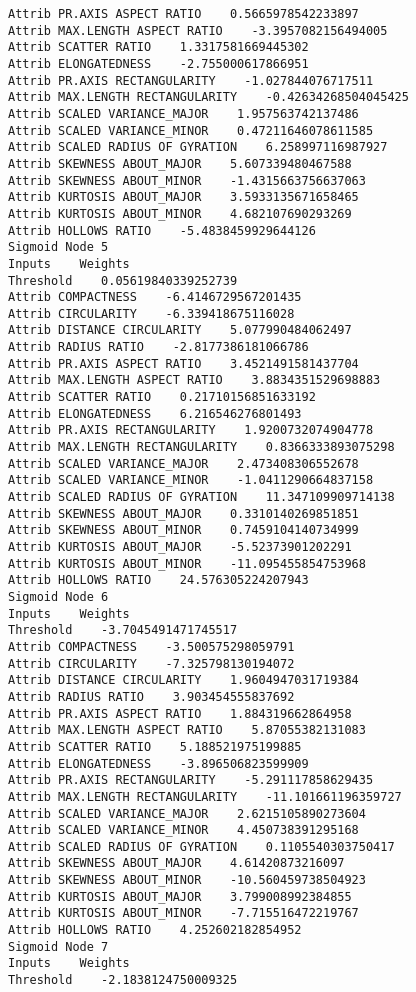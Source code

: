 \documentclass[
	article,			%
	11pt,				%
	oneside,			%
	a4paper,			%
	english,			%
	brazil,				%
	sumario=tradicional
	]{abntex2}
\begin{document}
\begin{lstlisting}
Attrib PR.AXIS ASPECT RATIO    0.5665978542233897
Attrib MAX.LENGTH ASPECT RATIO    -3.3957082156494005
Attrib SCATTER RATIO    1.3317581669445302
Attrib ELONGATEDNESS    -2.755000617866951
Attrib PR.AXIS RECTANGULARITY    -1.027844076717511
Attrib MAX.LENGTH RECTANGULARITY    -0.42634268504045425
Attrib SCALED VARIANCE_MAJOR    1.957563742137486
Attrib SCALED VARIANCE_MINOR    0.47211646078611585
Attrib SCALED RADIUS OF GYRATION    6.258997116987927
Attrib SKEWNESS ABOUT_MAJOR    5.607339480467588
Attrib SKEWNESS ABOUT_MINOR    -1.4315663756637063
Attrib KURTOSIS ABOUT_MAJOR    3.5933135671658465
Attrib KURTOSIS ABOUT_MINOR    4.682107690293269
Attrib HOLLOWS RATIO    -5.4838459929644126
Sigmoid Node 5
Inputs    Weights
Threshold    0.05619840339252739
Attrib COMPACTNESS    -6.4146729567201435
Attrib CIRCULARITY    -6.339418675116028
Attrib DISTANCE CIRCULARITY    5.077990484062497
Attrib RADIUS RATIO    -2.8177386181066786
Attrib PR.AXIS ASPECT RATIO    3.4521491581437704
Attrib MAX.LENGTH ASPECT RATIO    3.8834351529698883
Attrib SCATTER RATIO    0.21710156851633192
Attrib ELONGATEDNESS    6.216546276801493
Attrib PR.AXIS RECTANGULARITY    1.9200732074904778
Attrib MAX.LENGTH RECTANGULARITY    0.8366333893075298
Attrib SCALED VARIANCE_MAJOR    2.473408306552678
Attrib SCALED VARIANCE_MINOR    -1.0411290664837158
Attrib SCALED RADIUS OF GYRATION    11.347109909714138
Attrib SKEWNESS ABOUT_MAJOR    0.3310140269851851
Attrib SKEWNESS ABOUT_MINOR    0.7459104140734999
Attrib KURTOSIS ABOUT_MAJOR    -5.52373901202291
Attrib KURTOSIS ABOUT_MINOR    -11.095455854753968
Attrib HOLLOWS RATIO    24.576305224207943
Sigmoid Node 6
Inputs    Weights
Threshold    -3.7045491471745517
Attrib COMPACTNESS    -3.500575298059791
Attrib CIRCULARITY    -7.325798130194072
Attrib DISTANCE CIRCULARITY    1.9604947031719384
Attrib RADIUS RATIO    3.903454555837692
Attrib PR.AXIS ASPECT RATIO    1.884319662864958
Attrib MAX.LENGTH ASPECT RATIO    5.87055382131083
Attrib SCATTER RATIO    5.188521975199885
Attrib ELONGATEDNESS    -3.896506823599909
Attrib PR.AXIS RECTANGULARITY    -5.291117858629435
Attrib MAX.LENGTH RECTANGULARITY    -11.101661196359727
Attrib SCALED VARIANCE_MAJOR    2.6215105890273604
Attrib SCALED VARIANCE_MINOR    4.450738391295168
Attrib SCALED RADIUS OF GYRATION    0.1105540303750417
Attrib SKEWNESS ABOUT_MAJOR    4.61420873216097
Attrib SKEWNESS ABOUT_MINOR    -10.560459738504923
Attrib KURTOSIS ABOUT_MAJOR    3.799008992384855
Attrib KURTOSIS ABOUT_MINOR    -7.715516472219767
Attrib HOLLOWS RATIO    4.252602182854952
Sigmoid Node 7
Inputs    Weights
Threshold    -2.1838124750009325

\end{lstlisting}
\end{document}
